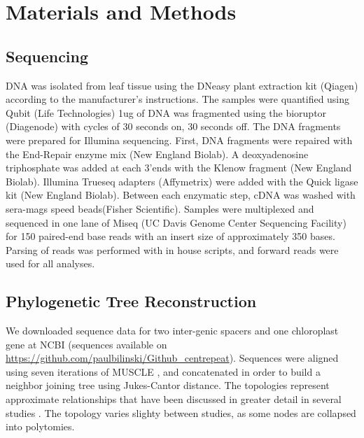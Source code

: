 \documentclass[10pt,letterpaper]{article}
\newcommand{\jri}[1]{\todo[size=\scriptsize, color=SkyBlue]{#1}}
\newcommand{\pb}[1]{\todo[size=\scriptsize, color=Bittersweet]{#1}} %
\begin{document}

\section*{Materials and Methods}

\subsection*{Sequencing}
DNA was isolated from leaf tissue using the DNeasy plant extraction kit (Qiagen) according to the manufacturer’s instructions. 
The samples were quantified using Qubit (Life Technologies) 1ug of DNA was fragmented using the bioruptor (Diagenode) with cycles of 30 seconds on, 30 seconds off. 
The DNA fragments were prepared for Illumina sequencing. 
First, DNA fragments were repaired with the End-Repair enzyme mix (New England Biolab). 
A deoxyadenosine triphosphate was added at each 3'ends with the Klenow fragment (New England Biolab). 
Illumina Trueseq adapters (Affymetrix) were added with the Quick ligase kit (New England Biolab). 
Between each enzymatic step, cDNA was washed with sera-mags speed beads(Fisher Scientific).
Samples were multiplexed and sequenced in one lane of Miseq (UC Davis Genome Center Sequencing Facility) for 150 paired-end base reads with an insert size of approximately 350 bases.
Parsing of reads was performed with in house scripts, and forward reads were used for all analyses.

\subsection*{Phylogenetic Tree Reconstruction}
We downloaded sequence data for two inter-genic spacers and one chloroplast gene at NCBI (sequences available on \url{https://github.com/paulbilinski/Github_centrepeat}).
Sequences were aligned using seven iterations of MUSCLE \cite{edgar2004muscle}, and concatenated in order to build a neighbor joining tree using Jukes-Cantor distance.
The topologies represent approximate relationships that have been discussed in greater detail in several studies  \cite{wu2012phylogeny,skendzic2007phylogenetics}.
The topology varies slighty between studies, as some nodes are collapsed into polytomies.%
\end{document}
